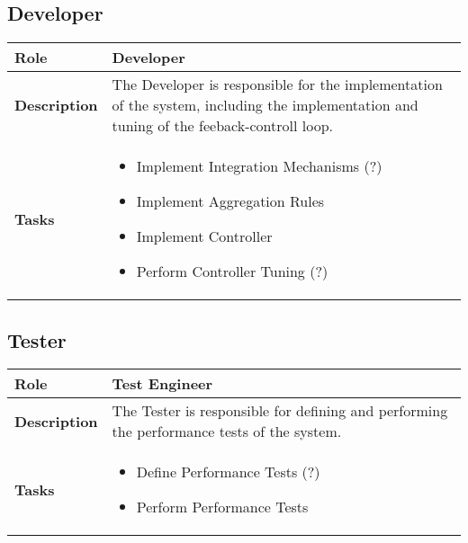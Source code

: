 \subsection{Developer}
\begin{minipage}{\textwidth}
 \label{table:ch6_Role_Developer}
\begin{tabular}
	{|m{2cm}|m{10cm}|} \hline \bfseries Role & Developer\\
	\hline \bfseries Description & The Developer is responsible for the implementation of the system, including the implementation and tuning of the feeback-controll loop.\\
	\hline \bfseries Tasks & 
	\begin{itemize}
		\item Implement Integration Mechanisms (?)
		\item Implement Aggregation Rules
		\item Implement Controller
		\item Perform Controller Tuning (?)
	\end{itemize}
	\\
	\hline 
\end{tabular}
\end{minipage}

\subsection{Tester}
\begin{minipage}{\textwidth}
 \label{table:ch6_Role_Tester}
\begin{tabular}
	{|m{2cm}|m{10cm}|} \hline \bfseries Role & Test Engineer\\
	\hline \bfseries Description & The Tester is responsible for defining and performing the performance tests of the system.\\
	\hline \bfseries Tasks & 
	\begin{itemize}
		\item Define Performance Tests (?)
		\item Perform Performance Tests
	\end{itemize}
	\\
	\hline
\end{tabular}
\end{minipage}

